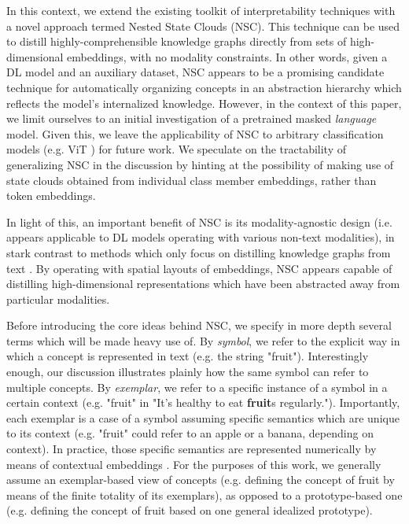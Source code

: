 In this context, we extend the existing toolkit of interpretability techniques with a novel approach termed Nested State Clouds (NSC). This technique can be used to distill highly-comprehensible knowledge graphs directly from sets of high-dimensional embeddings, with no modality constraints. In other words, given a DL model and an auxiliary dataset, NSC appears to be a promising candidate technique for automatically organizing concepts in an abstraction hierarchy which reflects the model's internalized knowledge. However, in the context of this paper, we limit ourselves to an initial investigation of a pretrained masked \textit{language} model. Given this, we leave the applicability of NSC to arbitrary classification models (e.g. ViT \citep{dosovitskiy_image_2021}) for future work. We speculate on the tractability of generalizing NSC in the discussion by hinting at the possibility of making use of state clouds obtained from individual class member embeddings, rather than token embeddings.

In light of this, an important benefit of NSC is its modality-agnostic design (i.e. appears applicable to DL models operating with various non-text modalities), in stark contrast to methods which only focus on distilling knowledge graphs from text \citep{wang_language_2020}. By operating with spatial layouts of embeddings, NSC appears capable of distilling high-dimensional representations which have been abstracted away from particular modalities.

Before introducing the core ideas behind NSC, we specify in more depth several terms which will be made heavy use of. By \textit{symbol}, we refer to the explicit way in which a concept is represented in text (e.g. the string "fruit"). Interestingly enough, our discussion illustrates plainly how the same symbol can refer to multiple concepts. By \textit{exemplar}, we refer to a specific instance of a symbol in a certain context (e.g. "fruit" in "It's healthy to eat \textbf{fruit}s regularly."). Importantly, each exemplar is a case of a symbol assuming specific semantics which are unique to its context (e.g. "fruit" could refer to an apple or a banana, depending on context). In practice, those specific semantics are represented numerically by means of contextual embeddings \citep{devlin_bert_nodate}. For the purposes of this work, we generally assume an exemplar-based view of concepts (e.g. defining the concept of fruit by means of the finite totality of its exemplars), as opposed to a prototype-based one (e.g. defining the concept of fruit based on one general idealized prototype).

